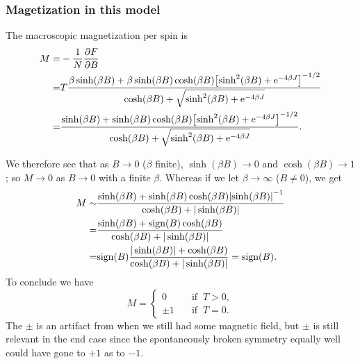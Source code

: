 \documentclass[11pt,letter, swedish, english
]{article}
\newcommand{\sign}{\ensuremath{\text{sign}}}
\begin{document}
\subsubsection*{Magetization in this model}
The macroscopic magnetization per spin is
\begin{equation}
\begin{aligned}
M=&-\frac{1}{N}\pdv{F}{B}\\
=&T\frac{\beta\sinh(\beta B)
+\beta\sinh(\beta B)\cosh(\beta B)
\qty[\sinh^2(\beta B)+\mathrm{e}^{-4\beta J}]^{-1/2}}
{\cosh(\beta B)+\sqrt{\sinh^2(\beta B)+\mathrm{e}^{-4\beta J}}}\\
=&\frac{\sinh(\beta B)
+\sinh(\beta B)\cosh(\beta B)
\qty[\sinh^2(\beta B)+\mathrm{e}^{-4\beta J}]^{-1/2}}
{\cosh(\beta B)+\sqrt{\sinh^2(\beta B)+\mathrm{e}^{-4\beta J}}}.
\end{aligned}
\end{equation}

We therefore see that as $B\to0$ ($\beta$ finite), $\sinh(\beta
B)\to0$ and $\cosh(\beta B)\to1$; so $M\to0$ as $B\to0$ with a finite 
$\beta$. Whereas if we let $\beta\to\infty$ ($B\neq0$), we
get\footnotemark{} 
\begin{equation}
\begin{aligned}
M\sim&\frac{\sinh(\beta B)
+\sinh(\beta B)\cosh(\beta B)
\qty|\sinh(\beta B)|^{-1}}
{\cosh(\beta B)+|\sinh(\beta B)|}\\
=&\frac{\sinh(\beta B)+\sign(B)\cosh(\beta B)}
{\cosh(\beta B)+|\sinh(\beta B)|}\\
=&\sign(B)\frac{|\sinh(\beta B)|+\cosh(\beta B)}
{\cosh(\beta B)+|\sinh(\beta B)|}
=\sign(B).
\end{aligned}
\end{equation}
To conclude we have
\begin{equation}
M=\begin{cases}
0\quad&\text{if }\ T>0,\\
\pm1\quad&\text{if }\ T=0.
\end{cases}
\end{equation}
The $\pm$ is an artifact from when we still had some magnetic field,
but $\pm$ is still relevant in the end case since the spontaneously
broken symmetry equally well could have gone to $+1$ as to $-1$. 

\end{document}
